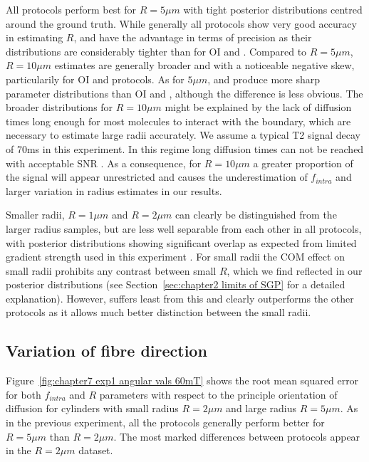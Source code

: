 All protocols perform best for $R=5\mu m$ with tight posterior distributions centred around the ground truth. While generally all protocols show very good accuracy in estimating $R$, {\DO} and {\FD} have the advantage in terms of precision as their distributions are considerably tighter than for {\gls{OI}} and {\SD}. Compared to $R=5\mu m$, $R=10\mu m$ estimates are generally broader and with a noticeable  negative skew, particularily for {\gls{OI}} and {\SD} protocols.  As for $5\mu m$, {\DO} and {\FD} produce more sharp parameter distributions than {\gls{OI}} and {\SD}, although the difference is less obvious. The broader distributions for $R=10\mu m$ might be explained by the lack of diffusion times long enough for most molecules to interact with the boundary, which are necessary to estimate large radii accurately.  We assume a typical T2 signal decay of 70ms in this experiment. In this regime long diffusion times can not be reached with acceptable \gls{SNR} \citep{Zhang:2011a}. As a consequence, for $R=10\mu m$ a greater proportion of the signal will appear unrestricted and causes the underestimation of $f_{intra}$ and larger variation in radius estimates in our results.

Smaller radii, $R=1\mu m$ and $R=2\mu m$ can clearly be distinguished from the larger radius samples, but are less well separable from each other in all protocols, with posterior distributions showing significant overlap as expected from limited gradient strength used in this experiment \citep{Alexander:2008,Alexander:2010,Siow:2012}. For small radii the \gls{COM} effect on small radii prohibits any contrast between small $R$, which we find reflected in our posterior distributions  (see Section~\ref{sec:chapter2 limits of SGP} for a detailed explanation). However, {\FD} suffers least from this and clearly outperforms the other protocols as it allows much better distinction between the small radii.


\subsection{Variation of fibre direction}
Figure~\ref{fig:chapter7 exp1 angular vals 60mT} shows the root mean squared error for both $f_{intra}$ and $R$ parameters with respect to the principle orientation of diffusion for cylinders with small radius $R=2\mu m$ and large radius $R=5\mu m$. As in the previous experiment, all the protocols generally perform better for $R=5\mu m$ than $R=2\mu m$. The most marked differences between protocols appear in the $R=2\mu m$ dataset.


